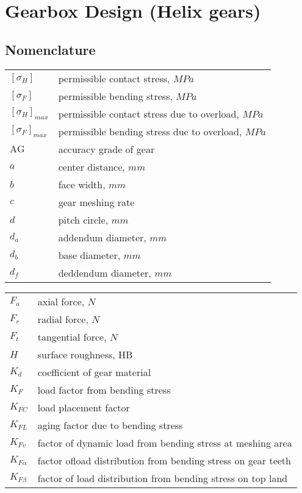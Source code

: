 \chapter{Gearbox Design (Helix gears)}
\section{Nomenclature}
	\begin{tabular}[t]{lp{6.5cm}}
		$ [\sigma_H] $ & permissible contact stress, $ MPa $\\
		$ [\sigma_F] $ & permissible bending stress, $ MPa $\\
		$ [\sigma_H]_{max} $ & permissible contact stress due to overload, $ MPa $\\
		$ [\sigma_F]_{max} $ & permissible bending stress due to overload, $ MPa $\\
		$ \text{AG} $ & accuracy grade of gear\\
		$ a $ & center distance, $ mm $\\
		$ b $ & face width, $ mm $\\
		$ c $ & gear meshing rate\\
		$ d $ & pitch circle, $ mm $\\
		$ d_a $ & addendum diameter, $ mm $\\
		$ d_b $ & base diameter, $ mm $\\
		$ d_f $ & deddendum diameter, $ mm $\\		
	\end{tabular}
	\begin{tabular}[t]{lp{6.5cm}}
		$ F_a $ & axial force, $ \unit{N} $\\
		$ F_r $ & radial force, $ \unit{N} $\\
		$ F_t $ & tangential force, $ \unit{N} $\\
		$ H $ & surface roughness, HB\\
		$ K_d $ & coefficient of gear material\\	
		$ K_F $ & load factor from bending stress\\
		$ K_{FC} $ & load placement factor\\
		$ K_{FL} $ & aging factor due to bending stress\\
		$ K_{Fv} $ & factor of dynamic load from bending stress at meshing area\\
		$ K_{F\alpha} $ & factor ofload distribution from bending stress on gear teeth\\
		$ K_{F\beta} $ & factor of load distribution from bending stress on top land\\
	\end{tabular}\newpage
